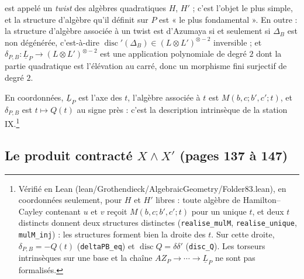 \documentclass[11pt,a4paper]{article}
\begin{document}
est appelé un \emph{twist} des algèbres quadratiques $H$, $H'$ ; c'est l'objet
le plus simple, et la structure d'algèbre qu'il définit sur $P$ est « le plus
fondamental ». En outre : la structure d'algèbre associée à un twist est
d'Azumaya si et seulement si $\Delta_B$ est non dégénérée, c'est-à-dire
$\operatorname{disc}'(\Delta_B) \in (L \otimes L')^{\otimes -2}$ inversible ; et
$\delta_{P,B} : \underline{L}_P \to (L \otimes L')^{\otimes -2}$ est une
application polynomiale de degré $2$ dont la partie quadratique est
l'élévation au carré, donc un morphisme fini surjectif de degré $2$.

En coordonnées, $\underline{L}_P$ est l'axe des $t$, l'algèbre associée à $t$
est $M(b, c; b', c'; t)$, et $\delta_{P,B}$ est $t \mapsto Q(t)$ au signe près :
c'est la description intrinsèque de la station IX.\footnote{Vérifié en
Lean (lean/Grothendieck/AlgebraicGeometry/Folder83.lean), en coordonnées seulement, pour $H$ et
$H'$ libres : toute algèbre de Hamilton--Cayley contenant $u$ et $v$ reçoit
$M(b, c; b', c'; t)$ pour un unique $t$, et deux $t$ distincts donnent deux
structures distinctes (\texttt{realise\_mulM}, \texttt{realise\_unique},
\texttt{mulM\_inj}) : les structures forment bien la droite des $t$. Sur cette
droite, $\delta_{P,B} = -Q(t)$ (\texttt{deltaPB\_eq}) et $\operatorname{disc} Q
= \delta\delta'$ (\texttt{disc\_Q}). Les torseurs intrinsèques sur une base et
la chaîne $AZ_P \to \cdots \to \underline{L}_P$ ne sont pas formalisés.}

\subsection*{Le produit contracté $X \wedge X'$ (pages 137 à 147)}
\end{document}
